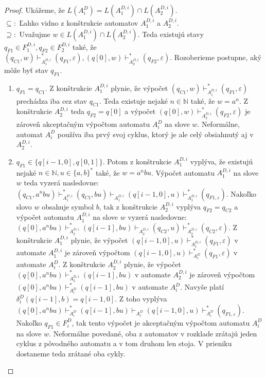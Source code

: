 \begin{proof}
Ukážeme, že $ L(A_i^D) = L(A_1^{D,i}) \cap L(A_2^{D,i}) $. \\
$ \subseteq: $ Ľahko vidno z konštrukcie automatov $ A_1^{D,i}$ a $ A_2^{D,i} $. \\
$ \supseteq: $ Uvažujme $ w \in L(A_1^{D,i}) \cap L(A_2^{D,i}) $. Teda existujú stavy $ q_{F1} \in F_1^{D,i}, q_{F2} \in F_2^{D,i}$ také, že $ (q_{C1},w) \vdash_{A_1^{D,i}}^* (q_{F1}, \varepsilon), (q[0],w) \vdash_{A_2^{D,i}}^* (q_{F2}, \varepsilon)$. Rozoberieme postupne, aký môže byť stav $ q_{F1} $.
\begin{enumerate}
\item $ q_{F1} = q_{C1} $. Z konštrukcie $ A_1^{D,i} $ plynie, že výpočet $ (q_{C1},w) \vdash_{A_1^{D,i}}^* (q_{F1}, \varepsilon)$ prechádza iba cez stav $ q_{C1} $. Teda existuje nejaké $ n \in \mathbb{N} $ také, že $ w=a^n $. Z konštrukcie $ A_2^{D,i} $ teda $ q_{F2} = q[0] $ a výpočet $ (q[0],w) \vdash_{A_2^{D,i}}^* (q_{F2}, \varepsilon) $ je zároveň akceptačným výpočtom automatu $ A_i^D $ na slove $ w $. Neformálne, automat $ A_i^D $ používa iba prvý svoj cyklus, ktorý je ale celý obsiahnutý aj v $ A_2^{D,i} $.
\item $ q_{F1} \in \lbrace q[i-1,0],q[0,1] \rbrace $. Potom z konštrukcie $ A_1^{D,i} $ vyplýva, že existujú nejaké $ n \in \mathbb{N}, u \in \lbrace a,b \rbrace^* $ také, že $ w = a^nbu $. Výpočet automatu $ A_1^{D,i} $ na slove $ w $ teda vyzerá nasledovne: $ (q_{C1},a^nbu) \vdash_{A_1^{D,i}}^* (q_{C1},bu) \vdash_{A_1^{D,i}} (q[i-1,0],u) \vdash_{A_1^{D,i}}^* (q_{F1, \varepsilon}) $. Nakoľko slovo $ w $ obsahuje symbol $ b $, tak z konštrukcie $ A_2^{D,i} $ vyplýva $ q_{F2} = q_{C2} $ a výpočet automatu $ A_1^{D,i} $ na slove $ w $ vyzerá nasledovne: $ (q[0],a^nbu) \vdash_{A_2^{D,i}}^* (q[i-1],bu) \vdash_{A_2^{D,i}} (q_{C2},u) \vdash_{A_2^{D,i}}^* (q_{C2},\varepsilon)$. Z konštrukcie $ A_1^{D,i} $ plynie, že výpočet $ (q[i-1,0],u) \vdash_{A_1^{D,i}}^* (q_{F1}, \varepsilon) $ v automate $ A_1^{D,i} $ je zároveň výpočtom $ (q[i-1,0],u) \vdash_{A_i^D}^* (q_{F1}, \varepsilon) $ v automate $  A_i^D $. Z konštrukcie $ A_2^{D,i} $ plynie, že výpočet $ (q[0],a^nbu) \vdash_{A_2^{D,i}}^* (q[i-1],bu) $ v automate $ A_2^{D,i} $ je zároveň výpočtom $ (q[0],a^nbu) \vdash_{A_i^D}^* (q[i-1],bu) $ v automate $  A_i^D $. Navyše platí $ \delta_i^D(q[i-1],b) = q[i-1,0] $. Z toho vyplýva $ (q[0],a^nbu) \vdash_{A_i^D}^* (q[i-1],bu) \vdash_{A_i^D} (q[i-1,0],u) \vdash_{A_i^D}^* (q_{F1, \varepsilon}) $. Nakoľko $ q_{F1} \in F_i^D $, tak tento výpočet je akceptačným výpočtom automatu $ A_i^D $ na slove $ w $. Neformálne povedané, oba z automatov v rozklade zrátajú jeden cyklus z pôvodného automatu a v tom druhom len stoja. V prieniku dostaneme teda zrátané oba cykly.
\end{enumerate}


\end{proof}

